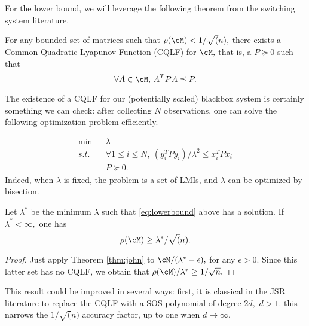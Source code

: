 For the lower bound, we will leverage the following theorem from the switching system literature.

\begin{theorem}\cite[Theorem 2.11]{jungers_lncis}\label{thm:john}
For any bounded set of matrices such that $\rho(\cM)<1/\sqrt(n),$ there exists a Common Quadratic Lyapunov Function (CQLF) for $\cM,$ that is, a $P\succeq 0$ such that $$\forall A\in \cM,\, A^TPA\preceq P. $$
\end{theorem}

%

The existence of a CQLF for our (potentially scaled) blackbox system is certainly something we can check: after collecting $N$ observations, one can solve the following optimization problem efficiently. 

\begin{eqnarray}
\nonumber \mbox{min}&&\lambda\\
 s.t.& & \label{eq:lowerbound} \forall 1\leq i \leq N,\ (y_i^T P y_i)/\lambda^2 \leq x_i^TPx_i\\
\nonumber && P \succeq 0.
\end{eqnarray}
Indeed, when $\lambda $ is fixed, the problem is a set of LMIs, and $\lambda $ can be optimized by bisection.

\begin{theorem}
Let $\lambda^*$ be the minimum $\lambda$ such that \eqref{eq:lowerbound} above has a solution.  If $\lambda^*<\infty,$ one has $$\rho(\cM) \geq \lambda^*/\sqrt(n) .$$
\end{theorem}
\begin{proof}
Just apply Theorem \ref{thm:john} to $\cM /(\lambda^*-\epsilon),$ for any $\epsilon>0.$ Since this latter set has no CQLF, we obtain that $\rho(\cM)/\lambda^*\geq 1/\sqrt{n}.$
\end{proof}
This result could be improved in several ways: first, it is classical in the JSR literature to replace the CQLF with a SOS polynomial of degree $2d,$ $d>1.$ this narrows the $1/\sqrt(n)$ accuracy factor, up to one when $d\rightarrow \infty.$  
